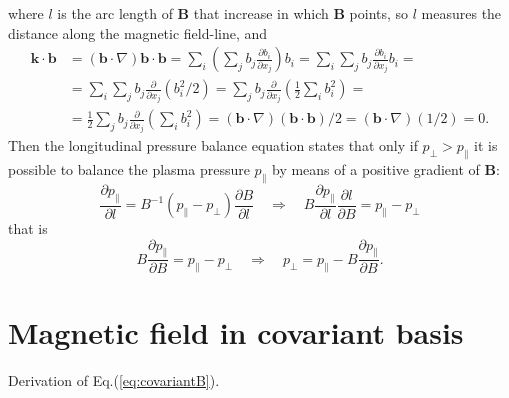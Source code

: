 where $l$ is the arc length of $\mathbf{B}$ that increase in which $\mathbf{B}$ points, so $l$ measures the distance along the magnetic field-line, and
\begin{equation}\label{eq:kb0}
  \begin{split}
    \mathbf{k}\cdot\mathbf{b}&=(\mathbf{b}\cdot\nabla)\mathbf{b}\cdot\mathbf{b}=\sum_i(\sum_j b_j \frac{\partial b_i}{\partial x_j})b_i=\sum_i\sum_j b_j \frac{\partial b_i}{\partial x_j}b_i=\\
    &=\sum_i\sum_j b_j \frac{\partial}{\partial x_j}(b_i^2/2)=\sum_j b_j \frac{\partial}{\partial x_j}(\frac{1}{2}\sum_i b_i^2)=\\
    &=\frac{1}{2}\sum_j b_j \frac{\partial}{\partial x_j}(\sum_i b_i^2)=(\mathbf{b}\cdot\nabla)(\mathbf{b}\cdot\mathbf{b})/2=(\mathbf{b}\cdot\nabla)(1/2)=0.
  \end{split}
\end{equation}
Then the longitudinal pressure balance equation states that only if $p_\perp>p_\parallel$ it is possible to balance the plasma pressure $p_\parallel$ by means of a positive gradient of $\mathbf{B}$:
\begin{equation}
 \frac{\partial p_\parallel}{\partial l}=B^{-1}(p_\parallel-p_\perp)\frac{\partial B}{\partial l}\quad\Rightarrow\quad B\frac{\partial p_\parallel}{\partial l}\frac{\partial l}{\partial B}=p_\parallel-p_\perp
\end{equation}
that is
\begin{equation*}
  B\frac{\partial p_\parallel}{\partial B}=p_\parallel-p_\perp\quad\Rightarrow\quad p_\perp=p_\parallel-B\frac{\partial p_\parallel}{\partial B}.
\end{equation*}

\section{Magnetic field in covariant basis}
Derivation of Eq.(\ref{eq:covariantB}).
\medskip

